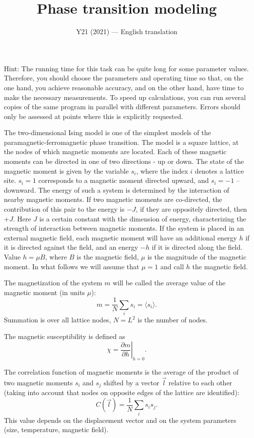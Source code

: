 \documentclass[11pt,a4paper]{article}
\title{\textbf{Phase transition modeling}}
\author{\normalsize Y21 (2021) --- English translation}
\date{}
\begin{document}
\maketitle

Hint: The running time for this task can be quite long for some parameter values. Therefore, you should choose the parameters and operating time so that, on the one hand, you achieve reasonable accuracy, and on the other hand, have time to make the necessary measurements. To speed up calculations, you can run several copies of the same program in parallel with different parameters. Errors should only be assessed at points where this is explicitly requested.

The two-dimensional Ising model is one of the simplest models of the paramagnetic-ferromagnetic phase transition. The model is a square lattice, at the nodes of which magnetic moments are located. Each of these magnetic moments can be directed in one of two directions - up or down. The state of the magnetic moment is given by the variable $s_i$, where the index $i$ denotes a lattice site. $s_i = 1$ corresponds to a magnetic moment directed upward, and $s_i =-1$ – downward. The energy of such a system is determined by the interaction of nearby magnetic moments. If two magnetic moments are co-directed, the contribution of this pair to the energy is $-J$, if they are oppositely directed, then $+J$. Here $J$ is a certain constant with the dimension of energy, characterizing the strength of interaction between magnetic moments. If the system is placed in an external magnetic field, each magnetic moment will have an additional energy $h$ if it is directed against the field, and an energy $-h$ if it is directed along the field. Value $h = \mu B$, where $B$ is the magnetic field, $\mu$ is the magnitude of the magnetic moment. In what follows we will assume that $\mu = 1$ and call $h$ the magnetic field.

The magnetization of the system $m$ will be called the average value of the magnetic moment (in units $\mu$): $$m = \frac{1}{N}\sum_i s_i = \langle s_i \rangle.$$ Summation is over all lattice nodes, $N = L^2$ is the number of nodes.

The magnetic susceptibility is defined as $$\chi = \left.\frac{\partial m}{\partial h}\right|_{h=0}.$$

The correlation function of magnetic moments is the average of the product of two magnetic moments $s_i$ and $s_j$ shifted by a vector $\vec{l}$ relative to each other (taking into account that nodes on opposite edges of the lattice are identified): $$C(\vec{l}) = \frac{1}{N}\sum_i s_i s_j.$$ This value depends on the displacement vector and on the system parameters (size, temperature, magnetic field).
\end{document}
